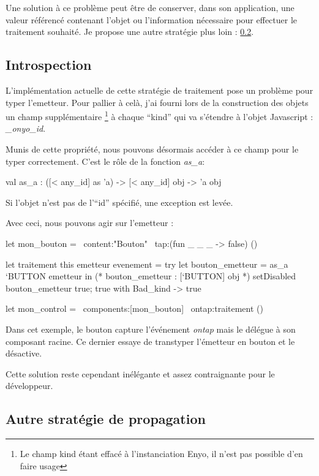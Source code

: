 \documentclass[11pt,a4paper]{report}
\begin{document}
Une solution à ce problème peut être de conserver, dans son application, une valeur référencé 
contenant l'objet ou l'information nécessaire pour effectuer le traitement souhaité.
Je propose une autre stratégie plus loin : \ref{sub:event_amel}.

\subsection{Introspection}

L'implémentation actuelle de cette stratégie de traitement pose un problème pour typer l'emetteur.
Pour pallier à celà, j'ai fourni lors de la construction des objets un champ supplémentaire
\footnote{Le champ kind étant effacé à l'instanciation Enyo, il n'est pas possible d'en faire usage} à chaque
``kind'' qui va s'étendre à l'objet Javascript : \emph{\_onyo\_id}.

Munis de cette propriété, nous pouvons désormais accéder à ce champ pour le typer correctement.
C'est le rôle de la fonction \emph{as\_a}:

\begin{OCaml}
  val as_a : ([< any_id] as 'a) -> [< any_id] obj -> 'a obj
\end{OCaml}

Si l'objet n'est pas de l'``id'' spécifié, une exception est levée.

Avec ceci, nous pouvons agir sur l'emetteur :
\begin{OCaml}
  let mon_bouton = ~content:"Bouton" ~tap:(fun _ _ _ -> false) ()

  let traitement this emetteur evenement =
     try 
         let bouton_emetteur = as_a `BUTTON emetteur in
         (* bouton_emetteur : [`BUTTON] obj *)
         setDisabled bouton_emetteur true;
         true
     with Bad_kind -> true

  let mon_control = ~components:[mon_bouton] ~ontap:traitement ()
\end{OCaml}

Dans cet exemple, le bouton capture l'événement \emph{ontap} mais le délégue
à son composant racine. Ce dernier essaye de transtyper l'émetteur en bouton
et le désactive.

Cette solution reste cependant inélégante et assez contraignante pour le développeur.

\subsection{Autre stratégie de propagation}\label{sub:event_amel}
\end{document}
